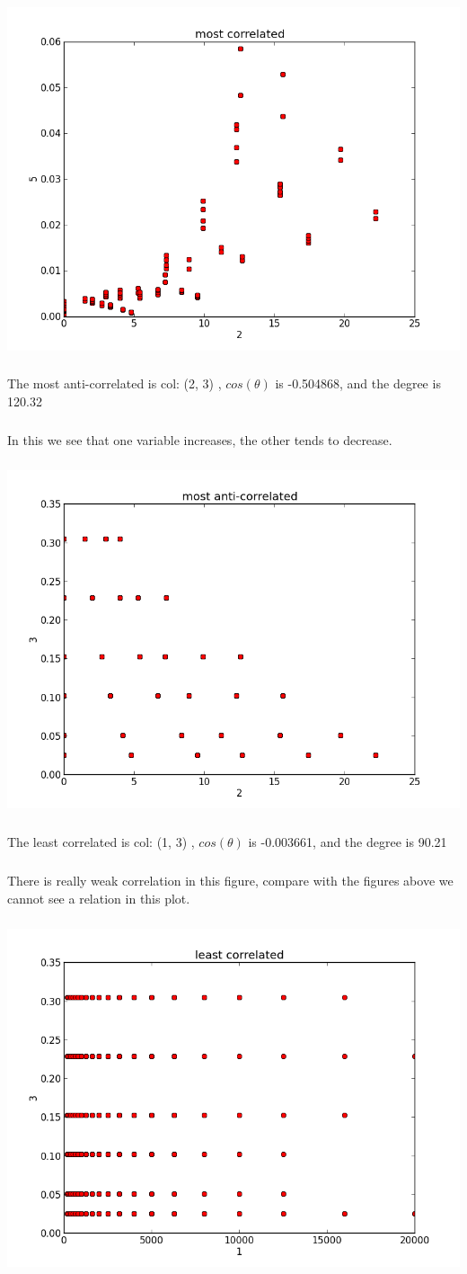 \documentclass{article}
\begin{document}
\subparagraph{}
\includegraphics[scale=0.5]{figure_1}
\subparagraph{}The most anti-correlated is col: (2, 3) , $cos(\theta)$ is  -0.504868, and the degree is 120.32
\subparagraph{}In this we see that one variable increases, the other tends to decrease.
\subparagraph{}
\includegraphics[scale=0.5]{figure_2}
\subparagraph{}The least correlated is col: (1, 3) , $cos(\theta)$ is  -0.003661, and the degree is 90.21
\subparagraph{}There is really weak correlation in this figure, compare with the figures above we cannot see a relation in this plot.
\subparagraph{}
\includegraphics[scale=0.5]{figure_3}
\end{document}
